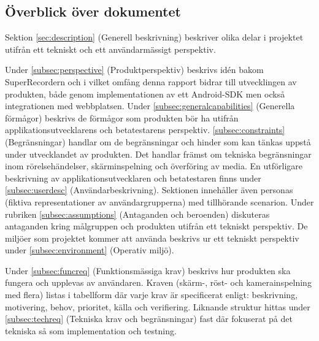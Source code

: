\subsection{Överblick över dokumentet}

Sektion \ref{sec:description} (Generell beskrivning) beskriver olika delar i projektet utifrån ett tekniskt och ett användarmässigt perspektiv.
 
Under \ref{subsec:perspective} (Produktperspektiv) beskrivs idén bakom SuperRecordern och i vilket omfång denna rapport bidrar till utvecklingen av produkten, både genom implementationen av ett Android-SDK men också integrationen med webbplatsen. Under \ref{subsec:generalcapabilities} (Generella förmågor) beskrivs de förmågor som produkten bör ha utifrån applikationsutvecklarens och betatestarens perspektiv. \ref{subsec:constraints} (Begränsningar) handlar om de begränsningar och hinder som kan tänkas uppstå under utvecklandet av produkten. Det handlar främst om tekniska begränsningar inom rörelsehändelser, skärminspelning och överföring av media. En utförligare beskrivning av applikationsutvecklaren och betatestaren finns under \ref{subsec:userdesc} (Användarbeskrivning). Sektionen innehåller även personas (fiktiva representationer av användargrupperna)  med tillhörande scenarion. Under rubriken \ref{subsec:assumptions} (Antaganden och beroenden) diskuteras antaganden kring målgruppen och produkten utifrån ett tekniskt perspektiv. De miljöer som projektet kommer att använda beskrivs ur ett tekniskt perspektiv under \ref{subsec:environment} (Operativ miljö).

Under \ref{subsec:funcreq} (Funktionsmässiga krav) beskrivs hur produkten ska fungera och upplevas av användaren. Kraven (skärm-, röst- och kamerainspelning med flera) listas i tabellform där varje krav är specificerat enligt: beskrivning, motivering, behov, prioritet, källa och verifiering. Liknande struktur hittas under \ref{subsec:techreq} (Tekniska krav och begränsningar) fast där fokuserat på det tekniska så som implementation och testning.